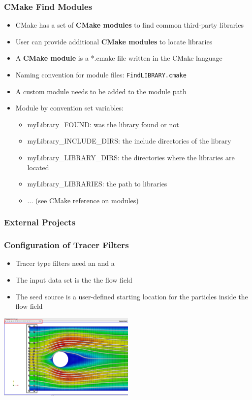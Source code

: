 \begin{frame}
  \frametitle{CMake Find Modules}

    \begin{itemize}
      \item CMake has a set of \textbf{CMake modules} to find common third-party libraries
      \item User can provide additional \textbf{CMake modules} to locate libraries 
      \item A \textbf{CMake module} is a *.cmake file written in the CMake language 
      \item Naming convention for module files: \texttt{FindLIBRARY.cmake} 
      \item A custom module needs to be added to the module path 
      \item Module by convention set variables:
    \begin{itemize}
      \item myLibrary\_FOUND: was the library found or not 
      \item myLibrary\_INCLUDE\_DIRS: the include directories of the library  
      \item myLibrary\_LIBRARY\_DIRS: the directories where the libraries are located  
      \item myLibrary\_LIBRARIES: the path to libraries  
      \item ... (see CMake reference on modules)  
    \end{itemize}
    \end{itemize}

\end{frame}

\begin{frame}

  \frametitle{External Projects}


\end{frame}

\begin{frame}

  \frametitle{Configuration of Tracer Filters}

    \begin{itemize}
      \item Tracer type filters need an  and a 
      \item The input data set is the the flow field  
      \item The seed source is a user-defined starting location for the particles inside the flow field  
    \end{itemize}
    \includegraphics[width=0.5\textwidth]{screenshots/tracer-source.png}

\end{frame}

